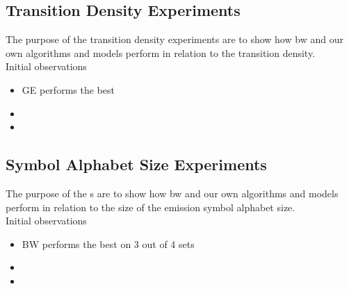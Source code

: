 \subsection{Transition Density Experiments}

The purpose of the transition density experiments are to show how \gls{bw} and our own algorithms and models perform in relation to the transition density.\\

	

Initial observations
\begin{itemize}
\item GE performs the best
\item 
\item 
\end{itemize}

\subsection{Symbol Alphabet Size Experiments}
The purpose of the s are to show how \gls{bw} and our own algorithms and models perform in relation to the size of the emission symbol alphabet size.\\

	
	
Initial observations
\begin{itemize}
\item BW performs the best on 3 out of 4 sets
\item 
\item 
\end{itemize}	
	
